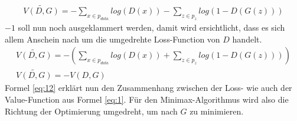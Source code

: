 \begin{align}
    \widetilde{V(D,G)} = - \sum_{x \in p_{data}} log(D(x)) - \sum_{z \in p_{z}} log(1 - D(G(z)))
\end{align}
$-1$ soll nun noch ausgeklammert werden, damit wird ersichtlicht, dass es sich allem Anschein nach um die
umgedrehte Loss-Function von $D$ handelt.
\begin{align}
    \widetilde{V(D,G)} = - (\sum_{x \in p_{data}} log(D(x)) + \sum_{z \in p_{z}} log(1 - D(G(z))))\\
    \widetilde{V(D,G)} = - V(D,G)\label{eq:12}
\end{align}
Formel \ref{eq:12} erklärt nun den Zusammenhang zwischen der Loss- wie auch der Value-Function aus Formel \ref{eq:1}.
Für den Minimax-Algorithmus wird also die Richtung der Optimierung umgedreht, um nach $G$ zu minimieren.

\newpage
